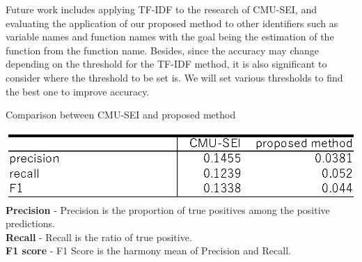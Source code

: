 \documentclass[JIP]{apris}
\begin{document}
Future work includes applying TF-IDF to the research of CMU-SEI, and evaluating the application of our proposed method to other identifiers such as variable names and function names with the goal being the estimation of the function from the function name. Besides, since the accuracy may change depending on the threshold for the TF-IDF method, it is also significant to consider where the threshold to be set is. We will set various thresholds to find the best one to improve accuracy.

\begin{table}[t]
 \caption{Comparison between CMU-SEI and proposed method\cite{flach2015precision} \cite{sasaki2007truth} }
 \includegraphics[width=1.0\hsize]{image/cmu-kyu.eps} 
 \label{table2} 
 \noindent \textbf{Precision} - Precision is the proportion of true positives among the positive predictions.\\
 \noindent \textbf{Recall} - Recall is the ratio of true positive.\\
 \noindent \textbf{F1 score} - F1 Score is the harmony mean of Precision and Recall.
\end{table}






\end{document}
